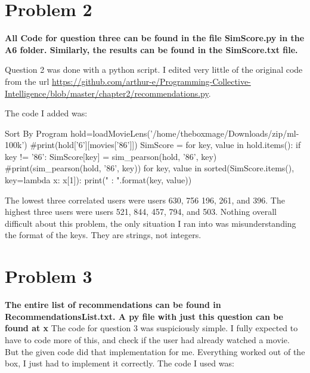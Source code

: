 \documentclass[11pt]{report}
\begin{document}
\section{Problem 2}
\textbf{All Code for question three can be found in the file SimScore.py in the A6 folder. Similarly, the results can be found in the SimScore.txt file.}

Question 2 was done with a python script. I edited very little of the original code from the url \url{https://github.com/arthur-e/Programming-Collective-Intelligence/blob/master/chapter2/recommendations.py}. 

The code I added was:
 
\begin{mylisting}{Sort By Program}
hold=loadMovieLens('/home/theboxmage/Downloads/zip/ml-100k')
#print(hold['6'][movies['86']])
SimScore = {}
for key, value in hold.items():
    if key != '86':
        SimScore[key] = sim_pearson(hold, '86', key)
        #print(sim_pearson(hold, '86', key))
for key, value in sorted(SimScore.items(), key=lambda x: x[1]):
    print("{}  :  {}".format(key, value))
\end{mylisting}

The lowest three correlated users were users 630, 756 196, 261, and 396. The highest three users were users 521, 844, 457, 794, and 503. Nothing overall difficult about this problem, the only situation I ran into was misunderstanding the format of the keys. They are strings, not integers.
\pagebreak
\section{Problem 3}
\textbf{The entire list of recommendations can be found in RecommendationsList.txt. A py file with just this question can be found at x}
The code for question 3 was suspiciously simple. I fully expected to have to code more of this, and check if the user had already watched a movie. But the given code did that implementation for me. Everything worked out of the box, I just had to implement it correctly. The code I used was:
\end{document}
